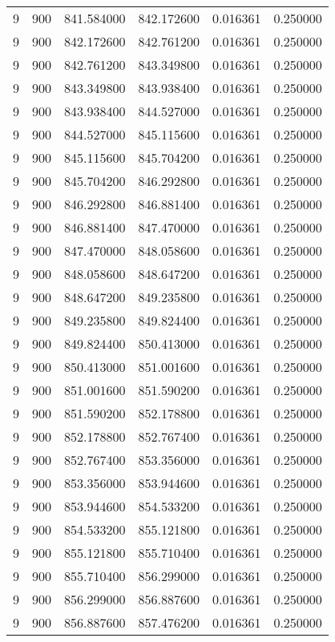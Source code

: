 \begin{longtable}{rrrrrr}
9 & 900 & 841.584000 & 842.172600 & 0.016361 & 0.250000 \\
9 & 900 & 842.172600 & 842.761200 & 0.016361 & 0.250000 \\
9 & 900 & 842.761200 & 843.349800 & 0.016361 & 0.250000 \\
9 & 900 & 843.349800 & 843.938400 & 0.016361 & 0.250000 \\
9 & 900 & 843.938400 & 844.527000 & 0.016361 & 0.250000 \\
9 & 900 & 844.527000 & 845.115600 & 0.016361 & 0.250000 \\
9 & 900 & 845.115600 & 845.704200 & 0.016361 & 0.250000 \\
9 & 900 & 845.704200 & 846.292800 & 0.016361 & 0.250000 \\
9 & 900 & 846.292800 & 846.881400 & 0.016361 & 0.250000 \\
9 & 900 & 846.881400 & 847.470000 & 0.016361 & 0.250000 \\
9 & 900 & 847.470000 & 848.058600 & 0.016361 & 0.250000 \\
9 & 900 & 848.058600 & 848.647200 & 0.016361 & 0.250000 \\
9 & 900 & 848.647200 & 849.235800 & 0.016361 & 0.250000 \\
9 & 900 & 849.235800 & 849.824400 & 0.016361 & 0.250000 \\
9 & 900 & 849.824400 & 850.413000 & 0.016361 & 0.250000 \\
9 & 900 & 850.413000 & 851.001600 & 0.016361 & 0.250000 \\
9 & 900 & 851.001600 & 851.590200 & 0.016361 & 0.250000 \\
9 & 900 & 851.590200 & 852.178800 & 0.016361 & 0.250000 \\
9 & 900 & 852.178800 & 852.767400 & 0.016361 & 0.250000 \\
9 & 900 & 852.767400 & 853.356000 & 0.016361 & 0.250000 \\
9 & 900 & 853.356000 & 853.944600 & 0.016361 & 0.250000 \\
9 & 900 & 853.944600 & 854.533200 & 0.016361 & 0.250000 \\
9 & 900 & 854.533200 & 855.121800 & 0.016361 & 0.250000 \\
9 & 900 & 855.121800 & 855.710400 & 0.016361 & 0.250000 \\
9 & 900 & 855.710400 & 856.299000 & 0.016361 & 0.250000 \\
9 & 900 & 856.299000 & 856.887600 & 0.016361 & 0.250000 \\
9 & 900 & 856.887600 & 857.476200 & 0.016361 & 0.250000 \\

\end{longtable}
